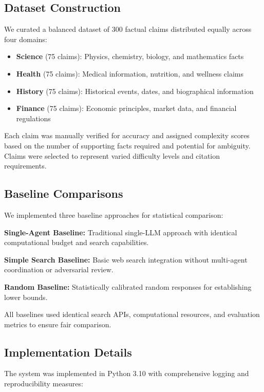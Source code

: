 \documentclass[11pt,a4paper]{article}
\begin{document}
\subsection{Dataset Construction}

We curated a balanced dataset of 300 factual claims distributed equally across four domains:

\begin{itemize}
    \item \textbf{Science} (75 claims): Physics, chemistry, biology, and mathematics facts
    \item \textbf{Health} (75 claims): Medical information, nutrition, and wellness claims  
    \item \textbf{History} (75 claims): Historical events, dates, and biographical information
    \item \textbf{Finance} (75 claims): Economic principles, market data, and financial regulations
\end{itemize}

Each claim was manually verified for accuracy and assigned complexity scores based on the number of supporting facts required and potential for ambiguity. Claims were selected to represent varied difficulty levels and citation requirements.

\subsection{Baseline Comparisons}

We implemented three baseline approaches for statistical comparison:

\textbf{Single-Agent Baseline:} Traditional single-LLM approach with identical computational budget and search capabilities.

\textbf{Simple Search Baseline:} Basic web search integration without multi-agent coordination or adversarial review.

\textbf{Random Baseline:} Statistically calibrated random responses for establishing lower bounds.

All baselines used identical search APIs, computational resources, and evaluation metrics to ensure fair comparison.

\subsection{Implementation Details}

The system was implemented in Python 3.10 with comprehensive logging and reproducibility measures:
\end{document}
